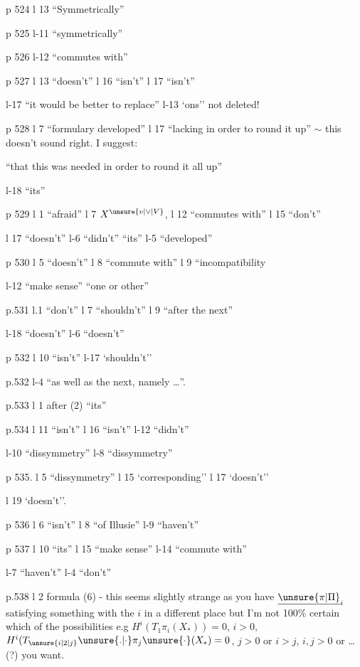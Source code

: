 p 524 l 13 ``Symmetrically''

p 525 l-11 ``symmetrically'' 

p 526 l-12 ``commutes with''

p 527 l 13 ``doesn't'' \quad l 16 ``isn't'' \quad l 17 ``isn't'' \quad {}

l-17 ``it would be better to replace'' \quad l-13 `ons'' not deleted!

p 528 l 7 ``formulary developed'' \quad l 17 ``lacking in order to round it up'' \(\sim\) this doesn't sound right. I suggest:

``that this was needed in order to round it all up''

l-18 ``its''

p 529 l 1 ``afraid'' \quad l 7 $X^{\unsure{v|\vee|V}}$, \quad l 12 ``commutes with'' \quad l 15 ``don't''

l 17 ``doesn't'' \quad l-6 ``didn't'' ``its'' \quad l-5 ``developed''

p 530 l 5 ``doesn't'' \quad l 8 ``commute with'' \quad l 9 ``incompatibility

l-12 ``make sense'' ``one or other''

p.531 l.1 ``don't'' \quad l 7 ``shouldn't'' \quad l 9 ``after the next''

l-18 ``doesn't'' \quad l-6 ``doesn't''

p 532 l 10 ``isn't'' \quad l-17 `shouldn't'' \quad {}


p.532 l-4 ``as well as the next, namely \ldots{}''.

p.533 l 1 after (2) ``its''

p.534 l 11 ``isn't'' \quad l 16 ``isn't'' \quad l-12 ``didn't''

l-10 ``dissymmetry'' \quad l-8 ``dissymmetry''

p 535. l 5 ``dissymmetry'' \quad l 15 `corresponding'' \quad l 17 `doesn't''

l 19 `doesn't''.

p 536 l 6 ``isn't'' \quad l 8 ``of Illusie'' \quad l-9 ``haven't''

p 537 l 10 ``its'' \quad l 15 ``make sense'' \quad l-14 ``commute with''

l-7 ``haven't'' \quad l-4 ``don't''

p.538 l 2 formula (6) - this seems slightly strange as you have $\underline{\unsure{\pi|\Pi}}_{i}$ satisfying something with the $i$ in a different place but I'm not 100\% certain  which of the possibilities e.g $H^{i}(T_{1}\pi_{i}(X_{\ast}))=0$, $i>0$, $H^{i}(T_{\unsure{i|2|j}}{\unsure{.|\cdot}}\pi_{j}\unsure{\cdot}(X_{\ast})=0$, $j>0$ or $i>j$,  \unsure{,}$i,j>0$ or \ldots{} (?) you want.

